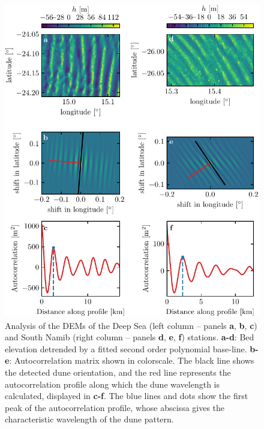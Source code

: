 \begin{figure}[p]
\centering
\includegraphics[scale=1]{Figures/Figure4_supp.pdf}
\caption{Analysis of the DEMs of the Deep Sea (left column -- panels \textbf{a}, \textbf{b}, \textbf{c}) and South Namib (right column -- panels \textbf{d}, \textbf{e}, \textbf{f}) stations. \textbf{a-d}: Bed elevation detrended by a fitted second order polynomial base-line. \textbf{b-e}: Autocorrelation matrix shown in colorscale. The black line shows the detected dune orientation, and the red line represents the autocorrelation profile along which the dune wavelength is calculated, displayed in \textbf{c-f}. The blue lines and dots show the first peak of the autocorrelation profile, whose abscissa gives the characteristic wavelength of the dune pattern.}
\label{Fig4_supp}
\end{figure}

